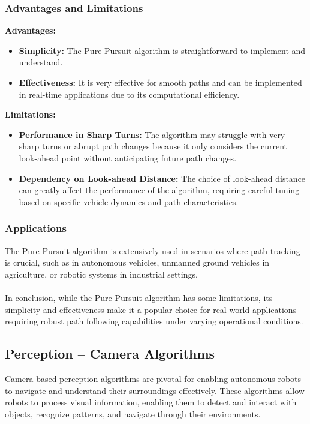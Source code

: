 \documentclass{article}
\begin{document}
	\subsubsection*{Advantages and Limitations}
	\textbf{Advantages:}
	\begin{itemize}
		\item \textbf{Simplicity:} The Pure Pursuit algorithm is straightforward to implement and understand.
		\item \textbf{Effectiveness:} It is very effective for smooth paths and can be implemented in real-time applications due to its computational efficiency.
	\end{itemize}
	\textbf{Limitations:}
	\begin{itemize}
		\item \textbf{Performance in Sharp Turns:} The algorithm may struggle with very sharp turns or abrupt path changes because it only considers the current look-ahead point without anticipating future path changes.
		\item \textbf{Dependency on Look-ahead Distance:} The choice of look-ahead distance can greatly affect the performance of the algorithm, requiring careful tuning based on specific vehicle dynamics and path characteristics.
	\end{itemize}
	
	\subsubsection*{Applications}
	The Pure Pursuit algorithm is extensively used in scenarios where path tracking is crucial, such as in autonomous vehicles, unmanned ground vehicles in agriculture, or robotic systems in industrial settings.
	\\\\
	In conclusion, while the Pure Pursuit algorithm has some limitations, its simplicity and effectiveness make it a popular choice for real-world applications requiring robust path following capabilities under varying operational conditions.
	
	\subsection{Perception – Camera Algorithms}
	Camera-based perception algorithms are pivotal for enabling autonomous robots to navigate and understand their surroundings effectively. These algorithms allow robots to process visual information, enabling them to detect and interact with objects, recognize patterns, and navigate through their environments.
	
\end{document}
